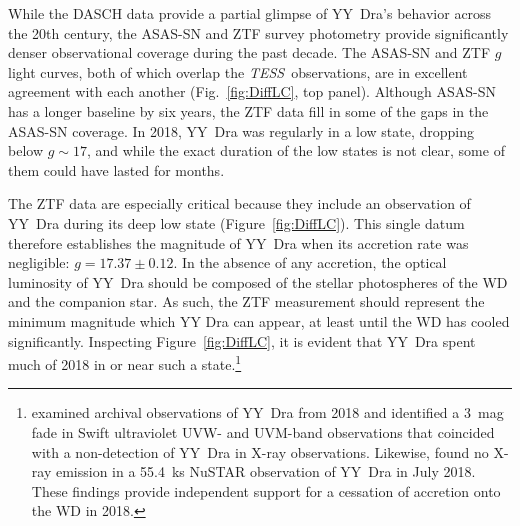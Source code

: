 \documentclass[twocolumn]{aastex63}
\newcommand{\TESS}{\textit{TESS}}
\begin{document}
While the DASCH data provide a partial glimpse of YY~Dra's behavior across the 20th century, the ASAS-SN and ZTF survey photometry provide significantly denser observational coverage during the past decade. The ASAS-SN and ZTF $g$ light curves, both of which overlap the \TESS\ observations, are in excellent agreement with each another (Fig.~\ref{fig:DiffLC}, top panel). Although ASAS-SN has a longer baseline by six years, the ZTF data fill in some of the gaps in the ASAS-SN coverage. In 2018, YY~Dra was regularly in a low state, dropping below $g\sim17$, and while the exact duration of the low states is not clear, some of them could have lasted for months. 


The ZTF data are especially critical because they include an observation of YY~Dra during its deep low state (Figure~\ref{fig:DiffLC}). This single datum therefore establishes the magnitude of YY~Dra when its accretion rate was negligible: $g = 17.37\pm0.12$. In the absence of any accretion, the optical luminosity of YY~Dra should be composed of the stellar photospheres of the WD and the companion star. As such, the ZTF measurement should represent the minimum magnitude which YY Dra can appear, at least until the WD has cooled significantly. Inspecting Figure~\ref{fig:DiffLC}, it is evident that  YY~Dra spent much of 2018 in or near such a state.\footnote{\citet{covington} examined archival observations of YY~Dra from 2018 and identified a 3~mag fade in Swift ultraviolet UVW- and UVM-band observations that coincided with a non-detection of YY~Dra in X-ray observations. Likewise, \citet{shaw2020} found no X-ray emission in a 55.4~ks NuSTAR observation of YY~Dra in July 2018. These findings provide independent support for a cessation of accretion onto the WD in 2018. }




\end{document}
